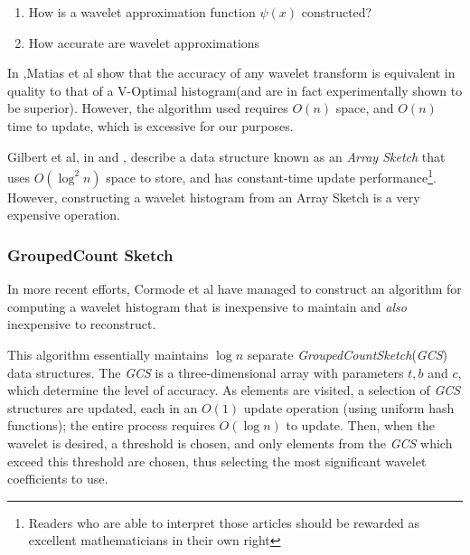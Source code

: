 \begin{enumerate}
				\item How is a wavelet approximation function $\psi(x)$ constructed?
				\item How accurate are wavelet approximations
\end{enumerate}

In \cite{MatiasWaveletHistogram},Matias et al show that the accuracy of any wavelet transform is equivalent in quality to that of a V-Optimal histogram(and are in fact experimentally shown to be superior). However, the algorithm used requires $O(n)$ space, and $O(n)$ time to update, which is excessive for our purposes.

Gilbert et al, in \cite{GilbertSurfing} and \cite{GilbertWaveletHistograms}, describe a data structure known as an \emph{Array Sketch} that uses $O(\log^2{n})$ space to store, and has constant-time update performance\footnote{Readers who are able to interpret those articles should be rewarded as excellent mathematicians in their own right}. However, constructing a wavelet histogram from an Array Sketch is a very expensive operation\cite{CormodeGroupedCountSketch}.

\subsubsection{GroupedCount Sketch}
\label{sec:GroupedCountSketch}
In more recent efforts, Cormode et al have managed to construct an algorithm for computing a wavelet histogram that is inexpensive to maintain and \emph{also} inexpensive to reconstruct\cite{CormodeGroupedCountSketch}.

This algorithm essentially maintains $\log{n}$ separate \emph{GroupedCountSketch}(\emph{GCS}) data structures. The \emph{GCS} is a three-dimensional array with parameters $t,b$ and $c$, which determine the level of accuracy. As elements are visited, a selection of \emph{GCS} structures are updated, each in an $O(1)$ update operation (using uniform hash functions); the entire process requires $O(\log{n})$ to update. Then, when the wavelet is desired, a threshold is chosen, and only elements from the \emph{GCS} which exceed this threshold are chosen, thus selecting the most significant wavelet coefficients to use. 



